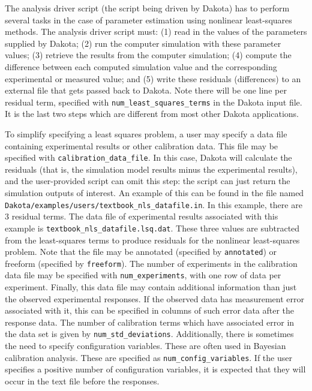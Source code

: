 The analysis driver script (the script being driven by Dakota) 
has to perform several tasks in the case of parameter estimation 
using nonlinear least-squares methods. The analysis driver script 
must: (1) read in the values of the parameters supplied by Dakota;
(2) run the computer simulation with these parameter values;
(3) retrieve the results from the computer simulation;
(4) compute the difference between each computed simulation value
and the corresponding experimental or measured value; and 
(5) write these residuals (differences)
to an external file that gets passed back to Dakota. Note there 
will be one line per residual term, specified with 
\texttt{num\_least\_squares\_terms}
in the Dakota input file. It is the last two steps which are different from 
most other Dakota applications. 

To simplify specifying a least squares problem, a user may specify a
data file containing experimental results or other calibration data.
This file may be specified with \texttt{calibration\_data\_file}. 
In this case, Dakota will calculate the residuals (that is, the
simulation model results minus the experimental results), and the
user-provided script can omit this step: the script can just return
the simulation outputs of interest. An example of this can be found
in the file named \texttt{Dakota/examples/users/textbook\_nls\_datafile.in}. 
In this example, there
are 3 residual terms. The data file of experimental results
associated with this example is \texttt{textbook\_nls\_datafile.lsq.dat}.
These three values are subtracted from the least-squares terms to
produce residuals for the nonlinear least-squares problem.
Note that the file may be annotated (specified by \texttt{annotated}) or 
freeform (specified by \texttt{freeform}). The number of experiments in the 
calibration data file may be specified with \texttt{num\_experiments}, 
with one row of data per experiment.
Finally, this data file may contain additional information than 
just the observed experimental responses. If the observed data 
has measurement error associated with it, this can be specified in 
columns of such error data after the response data. 
The number of calibration terms which have associated error in 
the data set is given by \texttt{num\_std\_deviations}. Additionally, 
there is sometimes the need to specify configuration variables. 
These are often used in Bayesian calibration analysis. These are 
specified as \texttt{num\_config\_variables}. If the user 
specifies a positive number of configuration variables, it is 
expected that they will occur in the text file before the responses. 

